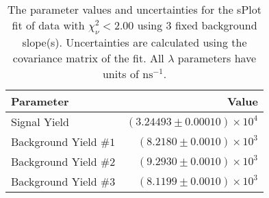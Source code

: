 
\begin{table}
    \begin{center}
        \begin{tabular}{lr}\toprule
            Parameter & Value \\\midrule
            Signal Yield & $(3.24493 \pm 0.00010) \times 10^{4}$ \\
            Background Yield $\#1$ & $(8.2180 \pm 0.0010) \times 10^{3}$ \\
            Background Yield $\#2$ & $(9.2930 \pm 0.0010) \times 10^{3}$ \\
            Background Yield $\#3$ & $(8.1199 \pm 0.0010) \times 10^{3}$ \\\bottomrule
        \end{tabular}
        \caption{The parameter values and uncertainties for the sPlot fit of data with $\chi^2_\nu < 2.00$ using 3 fixed background slope(s). Uncertainties are calculated using the covariance matrix of the fit. All $\lambda$ parameters have units of $\si{\nano\second}^{-1}$.}
    \end{center}
\end{table}
